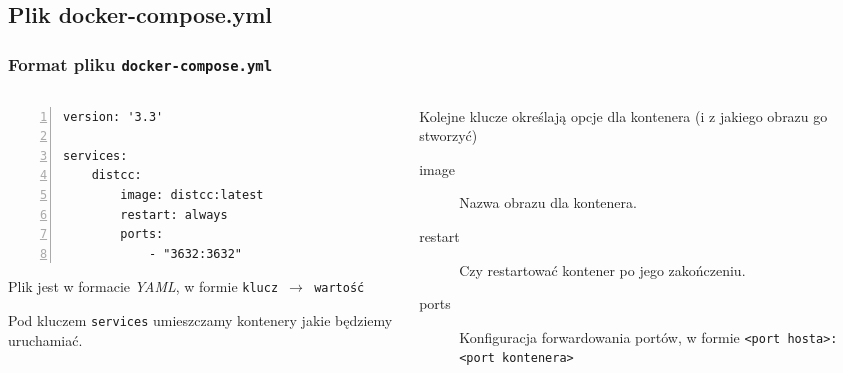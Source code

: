\documentclass[aspectratio=169]{beamer}
\begin{document}
\subsection{Plik docker-compose.yml}
\begin{frame}[fragile]
    \frametitle{Format pliku \texttt{docker-compose.yml}}
    \begin{columns}
        \begin{column}{0.45\textwidth}
            \begin{lstlisting}[frame=L,basicstyle=\scriptsize\ttfamily,numbers=left,
        morekeywords={version,services,image,ports,restart}]
version: '3.3'

services:
    distcc:
        image: distcc:latest
        restart: always
        ports:
            - "3632:3632"
    \end{lstlisting}
            Plik jest w formacie \emph{YAML}, w formie \texttt{klucz~$\rightarrow$~wartość}
    \pause

            \vspace{3mm}

            Pod kluczem \texttt{services} umieszczamy kontenery jakie będziemy uruchamiać.
        \end{column}
        \begin{column}{0.55\textwidth}
    \pause
            Kolejne klucze określają opcje dla kontenera (i z jakiego obrazu go stworzyć)

            \small{
                \begin{description}
                    \item[image] Nazwa obrazu dla kontenera.
    \pause
                    \item[restart] Czy restartować kontener po jego zakończeniu.
    \pause
                    \item[ports] Konfiguracja forwardowania portów, w formie \texttt{<port hosta>:<port kontenera>}
                \end{description}}
        \end{column}
    \end{columns}
\end{frame}
\end{document}
